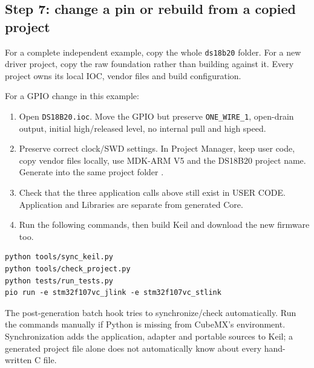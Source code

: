 \subsection{Step 7: change a pin or rebuild from a copied project}
For a complete independent example, copy the whole \texttt{ds18b20} folder. For a new driver project, copy the raw foundation rather than building against it. Every project owns its local IOC, vendor files and build configuration.

For a GPIO change in this example:
\begin{enumerate}
\item Open \texttt{DS18B20.ioc}. Move the GPIO but preserve \texttt{ONE\_WIRE\_1}, open-drain output, initial high/released level, no internal pull and high speed.
\item Preserve correct clock/SWD settings. In Project Manager, keep user code, copy vendor files locally, use MDK-ARM V5 and the DS18B20 project name. Generate into the same project folder \cite{cubemx}.
\item Check that the three application calls above still exist in USER CODE. Application and Libraries are separate from generated Core.
\item Run the following commands, then build Keil and download the new firmware too.
\end{enumerate}
\begin{lstlisting}[language={},numbers=none]
python tools/sync_keil.py
python tools/check_project.py
python tests/run_tests.py
pio run -e stm32f107vc_jlink -e stm32f107vc_stlink
\end{lstlisting}
The post-generation batch hook tries to synchronize/check automatically. Run the commands manually if Python is missing from CubeMX's environment. Synchronization adds the application, adapter and portable sources to Keil; a generated project file alone does not automatically know about every hand-written C file.


